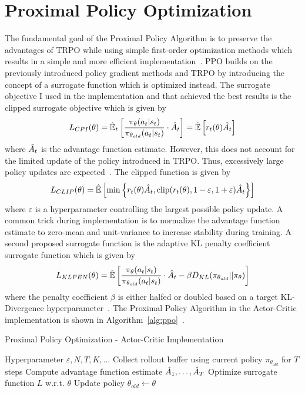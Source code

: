 \section{Proximal Policy Optimization}\label{sec:proximal-policy-optimization}
The fundamental goal of the Proximal Policy Algorithm is to preserve the advantages of TRPO while using simple first-order
optimization methods which results in a simple and more efficient implementation~\cite{schulman2017ppo}.
PPO builds on the previously introduced policy gradient methods and TRPO by introducing the concept of a surrogate function
which is optimized instead.
The surrogate objective I used in the implementation and that achieved the best results is the clipped surrogate objective
which is given by
\begin{equation}
    L_{CPI}(\theta) = \Hat{\mathbb{E}}_t \left[ \frac{\pi_\theta(a_t | s_t)}{\pi_{\theta_{old}}(a_t | s_t)}\cdot \Hat{A}_t \right] = \Hat{\mathbb{E}}\left[ r_t(\theta)\Hat{A}_t \right]
\end{equation}
where $\Hat{A}_t$ is the advantage function estimate.
However, this does not account for the limited update of the policy introduced in TRPO.
Thus, excessively large policy updates are expected~\cite{schulman2017ppo}.
The clipped function is given by
\begin{equation}
    L_{CLIP}(\theta) = \Hat{\mathbb{E}}\left[ \min\left\{ r_t(\theta)\Hat{A}_t, \operatorname{clip}(r_t(\theta), 1-\varepsilon, 1+\varepsilon) \Hat{A}_t \right\} \right]
\end{equation}
where $\varepsilon$ is a hyperparameter controlling the largest possible policy update.
A common trick during implementation is to normalize the advantage function estimate to zero-mean and unit-variance to
increase stability during training.
A second proposed surrogate function is the adaptive KL penalty coefficient surrogate function which is given by
\begin{equation}
    L_{KLPEN}(\theta) = \Hat{\mathbb{E}}\left[ \frac{\pi_\theta(a_t | s_t)}{\pi_{\theta_{old}}(a_t | s_t)}\cdot \Hat{A}_t - \beta D_{KL}(\pi_{\theta_{old}} || \pi_\theta) \right]
\end{equation}
where the penalty coefficient $\beta$ is either halfed or doubled based on a target KL-Divergence hyperparameter~\cite{schulman2017ppo}.
The Proximal Policy Algorithm in the Actor-Critic implementation is shown in Algorithm~\ref{alg:ppo}~\cite{schulman2017ppo}.
\begin{algorithm}
\caption{Proximal Policy Optimization - Actor-Critic Implementation}\label{alg:ppo}
    \begin{algorithmic}
        \Require  Hyperparameter $\varepsilon, N, T, K, \dots$
            \State Collect rollout buffer using current policy $\pi_{\theta_{old}}$ for $T$ steps
            \State Compute advantage function estimate $\Hat{A}_1, \dots, \Hat{A}_T$
        \EndFor
            \State Optimize surrogate function $L$ w.r.t. $\theta$
            \State Update policy $\theta_{old} \leftarrow \theta$
        \EndFor
        \EndWhile
    \end{algorithmic}
\end{algorithm}
